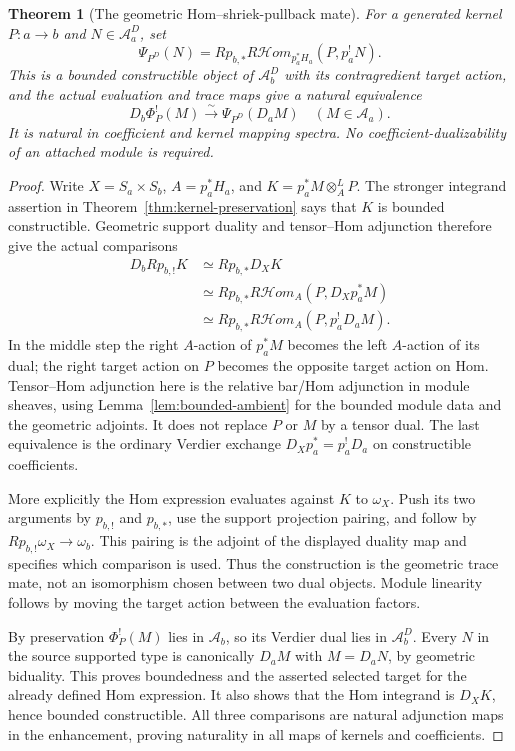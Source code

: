 \documentclass[11pt]{article}
\newtheorem{theorem}[proposition]{Theorem}
\theoremstyle{definition}
\theoremstyle{remark}
\begin{document}
\begin{theorem}[The geometric Hom--shriek-pullback mate]
\label{thm:geometric-star-mate}
For a generated kernel $P:a\to b$ and $N\in\mathcal A_a^D$, set
\[
 \Psi_{P^D}(N)=Rp_{b,*}R\mathcal Hom_{p_a^*H_a}
                         (P,p_a^!N).
\]
This is a bounded constructible object of $\mathcal A_b^D$ with its
contragredient target action, and the actual evaluation and trace maps
give a natural equivalence
\begin{equation}
 D_b\Phi_P^!(M)\xrightarrow{\sim}\Psi_{P^D}(D_aM)
 \quad(M\in\mathcal A_a).
 \label{eq:actual-geometric-mate}
\end{equation}
It is natural in coefficient and kernel mapping spectra.  No
coefficient-dualizability of an attached module is required.
\end{theorem}
\begin{proof}
Write $X=S_a\times S_b$, $A=p_a^*H_a$, and
$K=p_a^*M\otimes_A^LP$.  The stronger integrand assertion in
Theorem~\ref{thm:kernel-preservation} says that $K$ is bounded
constructible.  Geometric support duality and tensor--Hom adjunction
therefore give the actual comparisons
\begin{align*}
 D_bRp_{b,!}K
 &\simeq Rp_{b,*}D_XK\\
 &\simeq Rp_{b,*}R\mathcal Hom_A(P,D_Xp_a^*M)\\
 &\simeq Rp_{b,*}R\mathcal Hom_A(P,p_a^!D_aM).
\end{align*}
In the middle step the right $A$-action of $p_a^*M$ becomes the left
$A$-action of its dual; the right target action on $P$ becomes the
opposite target action on Hom.  Tensor--Hom adjunction here is the
relative bar/Hom adjunction in module sheaves, using
Lemma~\ref{lem:bounded-ambient} for the bounded module data and the
geometric adjoints.  It does not replace
$P$ or $M$ by a tensor dual.  The last equivalence is the ordinary
Verdier exchange $D_Xp_a^*=p_a^!D_a$ on constructible coefficients.

More explicitly the Hom expression evaluates against $K$ to
$\omega_X$.  Push its two arguments by $p_{b,!}$ and $p_{b,*}$,
use the support projection pairing, and follow by
$Rp_{b,!}\omega_X\to\omega_b$.  This pairing is the adjoint of
the displayed duality map and specifies which comparison is used.
Thus the construction is the geometric trace mate, not an isomorphism
chosen between two dual objects.  Module linearity follows by moving
the target action between the evaluation factors.

By preservation $\Phi_P^!(M)$ lies in $\mathcal A_b$, so its Verdier
dual lies in $\mathcal A_b^D$.  Every $N$ in the source supported
type is canonically $D_aM$ with $M=D_aN$, by geometric biduality.
This proves boundedness and the asserted selected target for the
already defined Hom expression.  It also shows that the Hom integrand
is $D_XK$, hence bounded constructible.  All three comparisons are
natural adjunction maps in the enhancement, proving naturality in
all maps of kernels and coefficients.
\end{proof}
\end{document}
